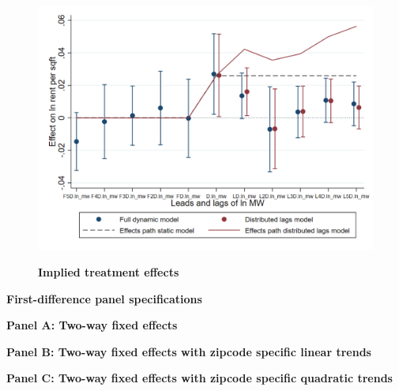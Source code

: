 \documentclass{article}
\begin{document}
   \begin{figure}[H]
       \centering
       \caption{\textbf{Implied treatment effects}}
       \includegraphics[width = \textwidth]{../analysis/first_differences/output/fd_models}
       \label{fig: implied_paths}
  \end{figure}

\begin{table}[h!]
\caption{\textbf{First-difference panel specifications}}
    \centering
  \begin{subtable}[t]{0.88\linewidth}
          \caption*{\textbf{Panel A: Two-way fixed effects}}

    \centering
    \resizebox{\textwidth}{!}{
    \vspace{0pt}    
    
    }
    \end{subtable}
      
  \begin{subtable}[t]{0.88\linewidth}
      \caption*{\textbf{Panel B: Two-way fixed effects with zipcode specific linear trends}}
    \centering
     \resizebox{\textwidth}{!}{
    \vspace{0pt}    
    
    }
    \end{subtable}
    
  \begin{subtable}[t]{0.88\linewidth}
      \caption*{\textbf{Panel C: Two-way fixed effects with zipcode specific quadratic trends}}

    \centering
    \resizebox{\textwidth}{!}{
    \vspace{0pt}    
    
    }
    \end{subtable}
   \end{table}
   
\end{document}
